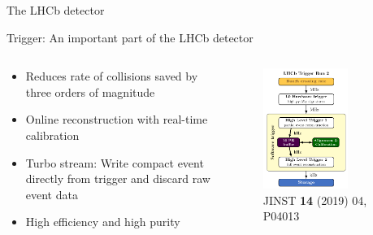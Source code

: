 \documentclass[dvipsnames]{beamer}
\begin{document}
\begin{frame}{The LHCb detector}
  \begin{center}
    {\Large Trigger: An important part of the LHCb detector}
  \end{center}
  \begin{columns}
    \begin{column}{0.5\textwidth}
      \begin{itemize}
        \setlength\itemsep{1.0em}
        \item{Reduces rate of collisions saved by three orders of magnitude}
        \item{Online reconstruction with real-time calibration}
        \item{Turbo stream: Write compact event directly from trigger and discard raw event data}
        \item{High efficiency and high purity}
      \end{itemize}
    \end{column}
    \begin{column}{0.5\textwidth}
      \begin{figure}
        \centering
        \includegraphics[width=0.7\textwidth]{Plots/LHCb_Run2_Trigger_Diagram.pdf}
        \vspace{-0.4cm}
        \caption*{\tiny JINST \textbf{14} (2019) 04, P04013}
      \end{figure}
    \end{column}
  \end{columns}
\end{frame}
\end{document}
